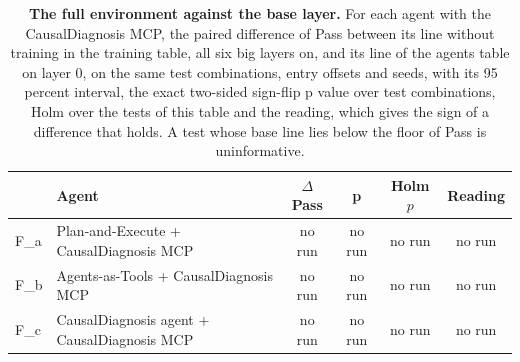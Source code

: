 \documentclass[10pt]{article}
\begin{document}
\begin{table}[H]\centering\footnotesize
\caption{\textbf{The full environment against the base layer.} For each agent with the CausalDiagnosis MCP, the paired difference of Pass between its line without training in the training table, all six big layers on, and its line of the agents table on layer 0, on the same test combinations, entry offsets and seeds, with its 95 percent interval, the exact two-sided sign-flip p value over test combinations, Holm over the tests of this table and the reading, which gives the sign of a difference that holds. A test whose base line lies below the floor of Pass is uninformative.}
\label{tab:fullenv}
\setlength{\tabcolsep}{3pt}
\begin{tabular}{l>{\raggedright\arraybackslash}p{6.4cm}cccc}
\toprule
 & Agent & $\Delta$Pass & p & Holm $p$ & Reading \\
\midrule
F\_a & Plan-and-Execute + CausalDiagnosis MCP & no run & no run & no run & no run \\
F\_b & Agents-as-Tools + CausalDiagnosis MCP & no run & no run & no run & no run \\
F\_c & CausalDiagnosis agent + CausalDiagnosis MCP & no run & no run & no run & no run \\
\bottomrule
\end{tabular}
\end{table}
\vspace{-8pt}
\end{document}
